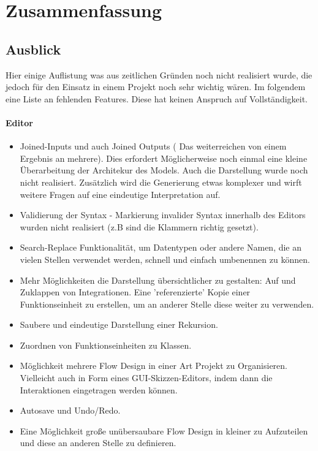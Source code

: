 \chapter{Zusammenfassung}
\section{Ausblick}
Hier einige Auflistung was aus zeitlichen Gründen noch nicht realisiert
wurde, die jedoch für den Einsatz in einem Projekt noch sehr wichtig wären.
Im folgendem eine Liste an fehlenden Features. Diese hat keinen Anspruch auf Vollständigkeit.
\subsubsection{Editor}
\begin{itemize}
	\item Joined-Inputs und auch Joined Outputs ( Das weiterreichen von einem Ergebnis an mehrere). Dies erfordert Möglicherweise noch einmal
	eine kleine Überarbeitung der Architekur des Models. Auch die Darstellung wurde noch nicht realisiert. Zusätzlich wird die Generierung etwas komplexer und wirft weitere Fragen auf eine eindeutige Interpretation auf.
	
	\item Validierung der Syntax - Markierung invalider Syntax innerhalb des Editors wurden nicht realisiert (z.B sind die Klammern richtig gesetzt).
	
	\item Search-Replace Funktionalität, um Datentypen oder andere Namen, die an vielen Stellen verwendet werden, schnell und  einfach umbenennen zu können.
	
	\item Mehr Möglichkeiten die Darstellung übersichtlicher zu gestalten: Auf und
	Zuklappen von Integrationen. Eine 'referenzierte' Kopie einer
	Funktionseinheit zu erstellen, um an anderer Stelle diese weiter zu
	verwenden.
	\item Saubere und eindeutige Darstellung einer Rekursion.
	\item Zuordnen von Funktionseinheiten zu Klassen.
	\item Möglichkeit mehrere Flow Design in einer Art Projekt zu Organisieren.
	Vielleicht auch in Form eines GUI-Skizzen-Editors, indem dann die
	Interaktionen eingetragen werden können.
	\item Autosave und Undo/Redo.
	\item Eine Möglichkeit große unübersaubare Flow Design in kleiner zu Aufzuteilen und diese an anderen Stelle zu definieren.

	
\end{itemize}


